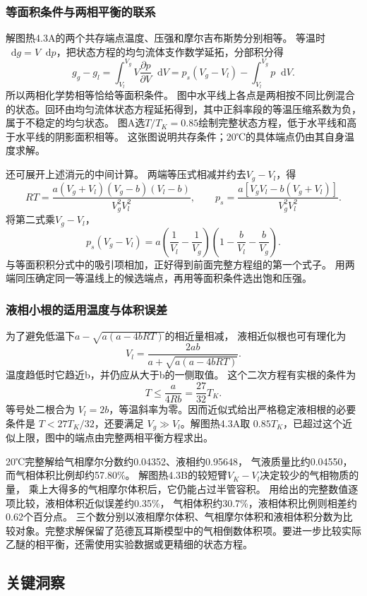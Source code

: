 \documentclass[UTF8,fontset=fandol,a4paper,11pt]{ctexart}
\newcommand{\dd}{\mathop{}\!\mathrm{d}}
\begin{document}
\subsubsection*{等面积条件与两相平衡的联系}
解图热4.3A的两个共存端点温度、压强和摩尔吉布斯势分别相等。
等温时$\dd g=V\dd p$，把状态方程的均匀流体支作数学延拓，分部积分得
\[
g_g-g_l=\int_{V_l}^{V_g}V\frac{\partial p}{\partial V}\dd V
=p_s(V_g-V_l)-\int_{V_l}^{V_g}p\dd V.
\]
所以两相化学势相等恰给等面积条件。
图中水平线上各点是两相按不同比例混合的状态。回环由均匀流体状态方程延拓得到，其中正斜率段的等温压缩系数为负，属于不稳定的均匀状态。
图A选$T/T_K=0.85$绘制完整状态方程，低于水平线和高于水平线的阴影面积相等。
这张图说明共存条件；20℃的具体端点仍由其自身温度求解。

还可展开上述消元的中间计算。
两端等压式相减并约去$V_g-V_l$，得
\[
RT=\frac{a(V_g+V_l)(V_g-b)(V_l-b)}{V_g^2V_l^2},\qquad
p_s=\frac{a[V_gV_l-b(V_g+V_l)]}{V_g^2V_l^2}.
\]
将第二式乘$V_g-V_l$，
\[
p_s(V_g-V_l)=a\left(\frac1{V_l}-\frac1{V_g}\right)
\left(1-\frac b{V_l}-\frac b{V_g}\right).
\]
与等面积积分式中的吸引项相加，正好得到前面完整方程组的第一个式子。
用两端同压确定同一等温线上的候选端点，再用等面积条件选出饱和压强。

\subsubsection*{液相小根的适用温度与体积误差}
为了避免低温下$a-\sqrt{a(a-4bRT)}$的相近量相减，
液相近似根也可有理化为
\[
V_l=\frac{2ab}{a+\sqrt{a(a-4bRT)}}.
\]
温度趋低时它趋近b，并仍应从大于b的一侧取值。
这个二次方程有实根的条件为
\[
T\le\frac{a}{4Rb}=\frac{27}{32}T_K.
\]
等号处二根合为 $V_l=2b$，等温斜率为零。因而近似式给出严格稳定液相根的必要条件是 $T<27T_K/32$，还要满足 $V_g\gg V_l$。解图热4.3A取 $0.85T_K$，已超过这个近似上限，图中的端点由完整两相平衡方程求出。

20℃完整解给气相摩尔分数约0.04352、液相约0.95648，
气液质量比约0.04550，而气相体积比例却约57.80\%。
解图热4.3B的较短臂$V_K-V_l$决定较少的气相物质的量，
乘上大得多的气相摩尔体积后，它仍能占过半管容积。
用给出的完整数值逐项比较，液相体积近似误差约0.35\%，
气相体积约30.7\%，液相体积比例则相差约0.62个百分点。
三个数分别以液相摩尔体积、气相摩尔体积和液相体积分数为比较对象。完整求解保留了范德瓦耳斯模型中的气相倒数体积项。要进一步比较实际乙醚的相平衡，还需使用实验数据或更精细的状态方程。




\subsection*{关键洞察}
\end{document}
